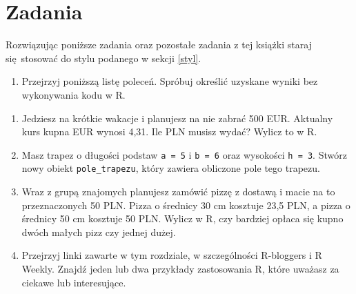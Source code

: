 \documentclass[paper=6in:9in,pagesize=pdftex,headinclude=on,footinclude=on,10pt]{scrbook}
\newenvironment{Shaded}{\begin{snugshade}}{\end{snugshade}}
\newcommand{\DecValTok}[1]{\textcolor[rgb]{0.00,0.00,0.81}{#1}}
\newcommand{\NormalTok}[1]{#1}
\newcommand{\OperatorTok}[1]{\textcolor[rgb]{0.81,0.36,0.00}{\textbf{#1}}}
\newcommand{\StringTok}[1]{\textcolor[rgb]{0.31,0.60,0.02}{#1}}
\providecommand{\tightlist}{%
  \setlength{\itemsep}{0pt}\setlength{\parskip}{0pt}}
\begin{document}
\hypertarget{zadania}{%
\section{Zadania}\label{zadania}}

Rozwiązując poniższe zadania oraz pozostałe zadania z tej książki staraj się~stosować do stylu podanego w sekcji \ref{styl}.

\begin{enumerate}
\def\labelenumi{\arabic{enumi})}
\tightlist
\item
  Przejrzyj poniższą listę poleceń.
  Spróbuj określić uzyskane wyniki bez wykonywania kodu w R.
\end{enumerate}

\begin{Shaded}
\end{Shaded}

\begin{enumerate}
\def\labelenumi{\arabic{enumi})}
\setcounter{enumi}{1}
\item
  Jedziesz na krótkie wakacje i planujesz na nie zabrać 500 EUR.
  Aktualny kurs kupna EUR wynosi 4,31.
  Ile PLN musisz wydać?
  Wylicz to w R.
\item
  Masz trapez o długości podstaw \texttt{a\ =\ 5} i \texttt{b\ =\ 6} oraz wysokości \texttt{h\ =\ 3}.
  Stwórz nowy obiekt \texttt{pole\_trapezu}, który zawiera obliczone pole tego trapezu.
\item
  Wraz z grupą znajomych planujesz zamówić pizzę z dostawą i macie na to przeznaczonych 50 PLN.
  Pizza o średnicy 30 cm kosztuje 23,5 PLN, a pizza o średnicy 50 cm kosztuje 50 PLN.
  Wylicz w R, czy bardziej opłaca się kupno dwóch małych pizz czy jednej dużej.
\item
  Przejrzyj linki zawarte w tym rozdziale, w szczególności R-bloggers i R Weekly.
  Znajdź jeden lub dwa przykłady zastosowania R, które uważasz za ciekawe lub interesujące.
\end{enumerate}
\end{document}
